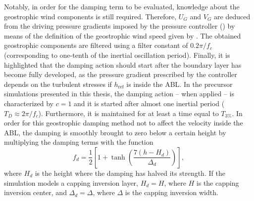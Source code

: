 Notably, in order for the damping term to be evaluated, knowledge about the geostrophic wind components is still required. Therefore, $U_G$ and $V_G$ are deduced from the driving pressure gradients imposed by the pressure controller () by means of the definition of the geostrophic wind speed given by . The obtained geostrophic components are filtered using a filter constant of $0.2\pi/f_c$ (corresponding to one-tenth of the inertial oscillation period). Finally, it is highlighted that the damping action should start after the boundary layer has become fully developed, as the pressure gradient prescribed by the controller depends on the turbulent stresses if $h_\text{ref}$ is inside the ABL. In the precursor simulations presented in this thesis, the damping action -- when applied -- is characterized by $c=1$ and it is started after almost one inertial period ($T_D\approx2\pi/f_c$). Furthermore, it is maintained for at least a time equal to $T_{3\%}$. In order for this geostrophic damping method not to affect the velocity inside the ABL, the damping is smoothly brought to zero below a certain height by multiplying the damping terms with the function
\begin{equation}
	f_d = \frac{1}{2}\left[1 + \tanh\left(\frac{7(h-H_d)}{\Delta_d}\right)\right],
	\label{eq:geoDampingFunction}
\end{equation}
where $H_d$ is the height where the damping has halved its strength. 
If the simulation models a capping inversion layer, $H_d = H$, where $H$ is the capping inversion center, and $\Delta_d = \Delta$, where $\Delta$ is the capping inversion width. 

